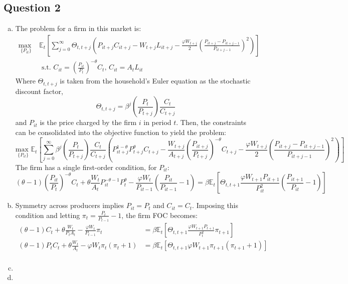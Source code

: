 \documentclass{article}
\newcommand{\usmax}[1]{\underset{#1}{\text{max }}}
\newcommand{\Et}[1]{\mathbb{E}_t\left[#1\right]}
\begin{document}
\pagebreak
\subsection*{Question 2}

\begin{enumerate}[(a)]

	\item The problem for a firm in this market is:
		{\small \begin{align*}
			\usmax{\{P_{it}\}}&\Et{\sum_{j=0}^\infty\Theta_{t,t+j}\left(P_{it+j}C_{it+j}-W_{t+j}L_{it+j} - \frac{\varphi W_{t+j}}{2}\left(\frac{P_{it+j}-P_{it+j-1}}{P_{it+j-1}}\right)^2\right)}	\\
				&\text{ s.t. } C_{it} = \left(\frac{P_{it}}{P_t}\right)^{-\theta}C_t\text{, }C_{it}=A_tL_{it}
		\end{align*} }
		Where $\Theta_{t,t+j}$ is taken from the household's Euler equation as the stochastic discount factor,
		\[
			\Theta_{t,t+j} = \beta^j\left(\frac{P_t}{P_{t+j}}\right)\frac{C_t}{C_{t+j}}
		\]
		and $P_{it}$ is the price charged by the firm $i$ in period $t$. Then, the constraints can be consolidated into the objective function to yield the problem:
		{\tiny \[
			\usmax{\{P_{it}\}}\Et{\sum_{j=0}^\infty\beta^j\left(\frac{P_t}{P_{t+j}}\right)\frac{C_t}{C_{t+j}}
				\left(P_{it+j}^{1-\theta}P_{t+j}^\theta C_{t+j}-\frac{W_{t+j}}{A_{t+j}}\left(\frac{P_{it+j}}{P_{t+j}}\right)^{-\theta}C_{t+j}-\frac{\varphi W_{t+j}}{2}\left(\frac{P_{it+j}-P_{it+j-1}}{P_{it+j-1}}\right)^2\right)}
		\] }
		The firm has a single first-order condition, for $P_{it}$:
		{\footnotesize \[
			(\theta-1)\left(\frac{P_{it}}{P_t}\right)^{-\theta}C_t + \theta\frac{W_t}{A_t}P_{it}^{-\theta-1}P_t^\theta - 
				\frac{\varphi W_t}{P_{it-1}}\left(\frac{P_{it}}{P_{it-1}} - 1\right)
			= \beta\Et{\Theta_{t,t+1}\frac{\varphi W_{t+1}P_{it+1}}{P_{it}^2}\left(\frac{P_{it+1}}{P_{it}}-1\right)}
		\] }
		
	\item Symmetry across producers implies ${P_{it}=P_t}$ and ${C_{it}=C_t}$. Imposing this condition and letting ${\pi_t=\frac{P_t}{P_{t-1}}-1}$, the firm FOC becomes:
		\begin{align*}
			(\theta-1)C_t + \theta\frac{W_t}{P_tA_t} - \frac{\varphi W_t}{P_{t-1}}\pi_t
				&= \beta\Et{\Theta_{t,t+1}\frac{\varphi W_{t+1}P_{t+1}}{P_{t}^2}\pi_{t+1}}	\\
			(\theta-1)P_tC_t + \theta\frac{W_t}{A_t} - \varphi W_t\pi_t(\pi_t+1)
				&= \beta\Et{\Theta_{t,t+1}\varphi W_{t+1}\pi_{t+1}(\pi_{t+1}+1)}	\\
		\end{align*}
	
	\item 
	
	\item 
	
	
\end{enumerate}
\end{document}
